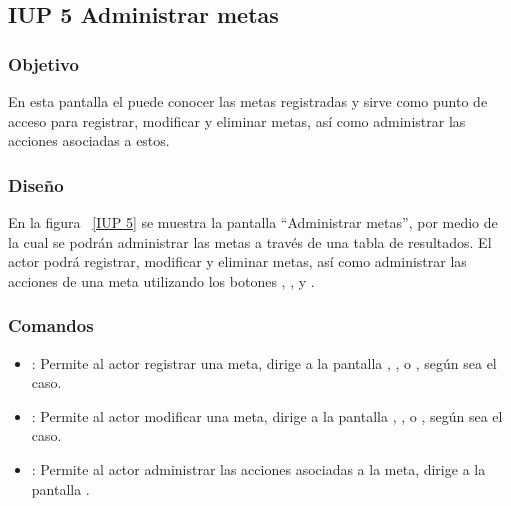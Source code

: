 \subsection{IUP 5 Administrar metas}
\subsubsection{Objetivo}
	
	En esta pantalla el  puede conocer las metas registradas y sirve
	como punto de acceso para registrar, modificar y eliminar metas, así como administrar las acciones asociadas a estos.
	

\subsubsection{Diseño}

    En la figura ~\ref{IUP 5} se muestra la pantalla ``Administrar metas'', por medio de la cual 
    se podrán administrar las metas a través de una tabla de resultados.
    El actor podrá registrar, modificar y eliminar metas, así como administrar las acciones de 
    una meta utilizando los botones , \botAdm, \botEdit y \botKo. \\



\subsubsection{Comandos}
\begin{itemize}
	\item {}: Permite al actor registrar una meta, dirige a la pantalla , ,  
	       o , según sea el caso.
	\item {}: Permite al actor modificar una meta, dirige a la pantalla , ,  
	       o , según sea el caso.
 	\item {}: Permite al actor administrar las acciones asociadas a la meta, dirige a la pantalla .
\end{itemize}

